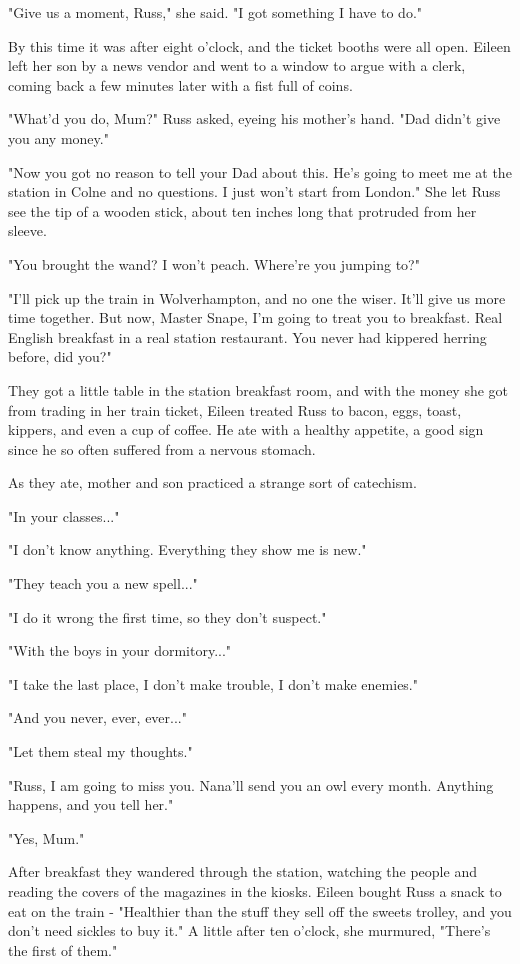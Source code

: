 \documentclass[a4paper,11pt]{article}
\begin{document}
"Give us a moment, Russ," she said. "I got something I have to do."

By this time it was after eight o'clock, and the ticket booths were all open. Eileen left her son by a news vendor and went to a window to argue with a clerk, coming back a few minutes later with a fist full of coins.

"What'd you do, Mum?" Russ asked, eyeing his mother's hand. "Dad didn't give you any money."

"Now you got no reason to tell your Dad about this. He's going to meet me at the station in Colne and no questions. I just won't start from London." She let Russ see the tip of a wooden stick, about ten inches long that protruded from her sleeve.

"You brought the wand? I won't peach. Where're you jumping to?"

"I'll pick up the train in Wolverhampton, and no one the wiser. It'll give us more time together. But now, Master Snape, I'm going to treat you to breakfast. Real English breakfast in a real station restaurant. You never had kippered herring before, did you?"

They got a little table in the station breakfast room, and with the money she got from trading in her train ticket, Eileen treated Russ to bacon, eggs, toast, kippers, and even a cup of coffee. He ate with a healthy appetite, a good sign since he so often suffered from a nervous stomach.

As they ate, mother and son practiced a strange sort of catechism.

"In your classes..."

"I don't know anything. Everything they show me is new."

"They teach you a new spell..."

"I do it wrong the first time, so they don't suspect."

"With the boys in your dormitory..."

"I take the last place, I don't make trouble, I don't make enemies."

"And you never, ever, ever..."

"Let them steal my thoughts."

"Russ, I am going to miss you. Nana'll send you an owl every month. Anything happens, and you tell her."

"Yes, Mum."

After breakfast they wandered through the station, watching the people and reading the covers of the magazines in the kiosks. Eileen bought Russ a snack to eat on the train - "Healthier than the stuff they sell off the sweets trolley, and you don't need sickles to buy it." A little after ten o'clock, she murmured, "There's the first of them."
\end{document}
